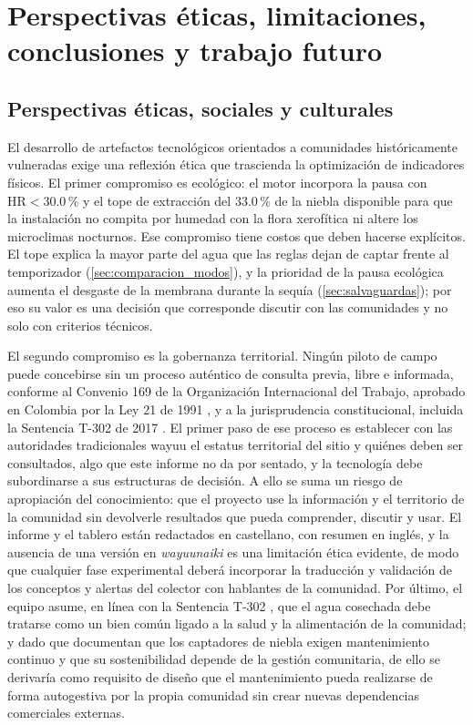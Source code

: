 \chapter{Perspectivas \'eticas, limitaciones, conclusiones y trabajo futuro}
\label{cap:conclusiones}

\section{Perspectivas \'eticas, sociales y culturales}
El desarrollo de artefactos tecnol\'ogicos orientados a comunidades hist\'oricamente vulneradas exige una reflexi\'on \'etica que trascienda la optimizaci\'on de indicadores f\'isicos. El primer compromiso es ecol\'ogico: el motor incorpora la pausa con $\text{HR} < 30.0\,\%$ y el tope de extracci\'on del $33.0\,\%$ de la niebla disponible para que la instalaci\'on no compita por humedad con la flora xerof\'itica ni altere los microclimas nocturnos. Ese compromiso tiene costos que deben hacerse expl\'icitos. El tope explica la mayor parte del agua que las reglas dejan de captar frente al temporizador (\cref{sec:comparacion_modos}), y la prioridad de la pausa ecol\'ogica aumenta el desgaste de la membrana durante la sequ\'ia (\cref{sec:salvaguardas}); por eso su valor es una decisi\'on que corresponde discutir con las comunidades y no solo con criterios t\'ecnicos.

El segundo compromiso es la gobernanza territorial. Ning\'un piloto de campo puede concebirse sin un proceso aut\'entico de consulta previa, libre e informada, conforme al Convenio 169 de la Organizaci\'on Internacional del Trabajo, aprobado en Colombia por la Ley 21 de 1991 \parencite{ley21de1991}, y a la jurisprudencia constitucional, incluida la Sentencia T-302 de 2017 \parencite{corte2017t302}. El primer paso de ese proceso es establecer con las autoridades tradicionales wayuu el estatus territorial del sitio y qui\'enes deben ser consultados, algo que este informe no da por sentado, y la tecnolog\'ia debe subordinarse a sus estructuras de decisi\'on. A ello se suma un riesgo de apropiaci\'on del conocimiento: que el proyecto use la informaci\'on y el territorio de la comunidad sin devolverle resultados que pueda comprender, discutir y usar. El informe y el tablero est\'an redactados en castellano, con resumen en ingl\'es, y la ausencia de una versi\'on en \emph{wayuunaiki} es una limitaci\'on \'etica evidente, de modo que cualquier fase experimental deber\'a incorporar la traducci\'on y validaci\'on de los conceptos y alertas del colector con hablantes de la comunidad. Por \'ultimo, el equipo asume, en l\'inea con la Sentencia T-302 \parencite{corte2017t302}, que el agua cosechada debe tratarse como un bien com\'un ligado a la salud y la alimentaci\'on de la comunidad; y dado que \textcite{fessehaye2014fog} documentan que los captadores de niebla exigen mantenimiento continuo y que su sostenibilidad depende de la gesti\'on comunitaria, de ello se derivar\'ia como requisito de dise\~no que el mantenimiento pueda realizarse de forma autogestiva por la propia comunidad sin crear nuevas dependencias comerciales externas.

